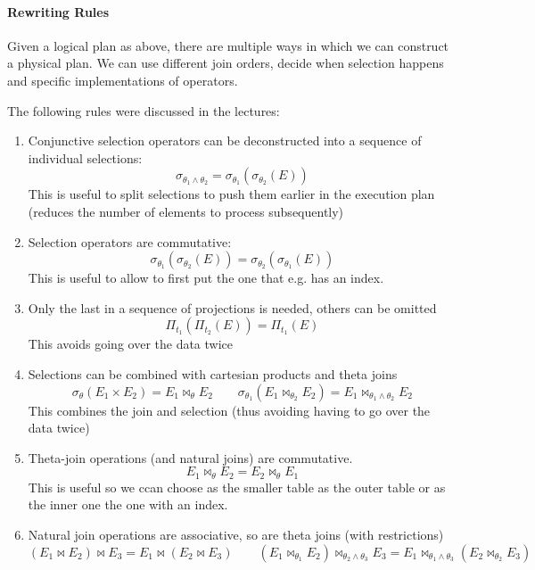 \paragraph{Rewriting Rules}
\label{sec:rewriting-rules}
Given a logical plan as above, there are multiple ways in which we can construct a physical plan.
We can use different join orders, decide when selection happens and specific implementations of operators.

The following rules were discussed in the lectures:
\begin{enumerate}[label=\textbf{R\arabic*}]
    \item Conjunctive selection operators can be deconstructed into a sequence of individual selections:
          \[
              \sigma_{\theta_1 \land \theta_2} = \sigma_{\theta_1}(\sigma_{\theta_2}(E))
          \]
          This is useful to split selections to push them earlier in the execution plan (reduces the number of elements to process subsequently)
    \item Selection operators are commutative:
          \[
              \sigma_{\theta_1}(\sigma_{\theta_2}(E)) = \sigma_{\theta_2}(\sigma_{\theta_1}(E))
          \]
          This is useful to allow to first put the one that e.g. has an index.
    \item Only the last in a sequence of projections is needed, others can be omitted
          \[
              \Pi_{t_1}(\Pi_{t_2}(E)) = \Pi_{t_1}(E)
          \]
          This avoids going over the data twice
    \item Selections can be combined with cartesian products and theta joins
          \[
              \sigma_\theta(E_1 \times E_2) = E_1 \bowtie_\theta E_2
              \qquad \sigma_{\theta_1}(E_1 \bowtie_{\theta_2} E_2) = E_1 \bowtie_{\theta_1 \land \theta_2} E_2
          \]
          This combines the join and selection (thus avoiding having to go over the data twice)
    \item Theta-join operations (and natural joins) are commutative.
          \[
              E_1 \bowtie_\theta E_2 = E_2 \bowtie_\theta E_1
          \]
          This is useful so we ccan choose as the smaller table as the outer table or as the inner one the one with an index.
    \item Natural join operations are associative, so are theta joins (with restrictions)
          \[
              (E_1 \bowtie E_2) \bowtie E_3 = E_1 \bowtie (E_2 \bowtie E_3)
              \qquad (E_1 \bowtie_{\theta_1} E_2) \bowtie_{\theta_2 \land \theta_3} E_3 = E_1 \bowtie_{\theta_1 \land \theta_3} (E_2 \bowtie_{\theta_2} E_3)
\]
\end{enumerate}
